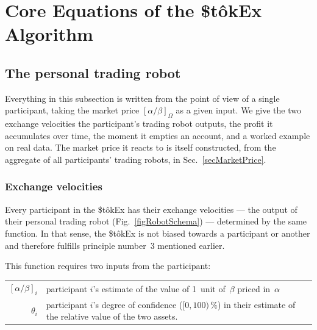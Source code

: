 \documentclass[letterpaper]{article}
\newcommand{\priceAB}{\left[\alpha / \beta\right]}
\newcommand{\StokEx}{\$t\^{o}kEx}
\begin{document}
\section{Core Equations of the \StokEx{} Algorithm}

\subsection{The personal trading robot} %

Everything in this subsection is written from the point of view of a single participant, taking the market price $\priceAB_\Omega$ as a given input.
We give the two exchange velocities the participant's trading robot outputs, the profit it accumulates over time, the moment it empties an account, and a worked example on real data.
The market price it reacts to is itself constructed, from the aggregate of all participants' trading robots, in Sec.~\ref{secMarketPrice}.

\subsubsection{Exchange velocities}

Every participant in the \StokEx{} has their exchange velocities --- the output of their personal trading robot (Fig.~\ref{figRobotSchema}) --- determined by the same function.
In that sense, the \StokEx{} is not biased towards a participant or another and therefore fulfills principle number~3 mentioned earlier.

This function requires two inputs from the participant:

\begin{tabularx}{\textwidth}{rX}
 $[\alpha/\beta]_i$ & participant $i$'s estimate of the value of 1~unit of~$\beta$ priced in~$\alpha$ \\
$\theta_i$ & participant $i$'s degree of confidence ($[0,100)\,\%$) in their estimate of the relative value of the two assets.
\end{tabularx}
\end{document}
